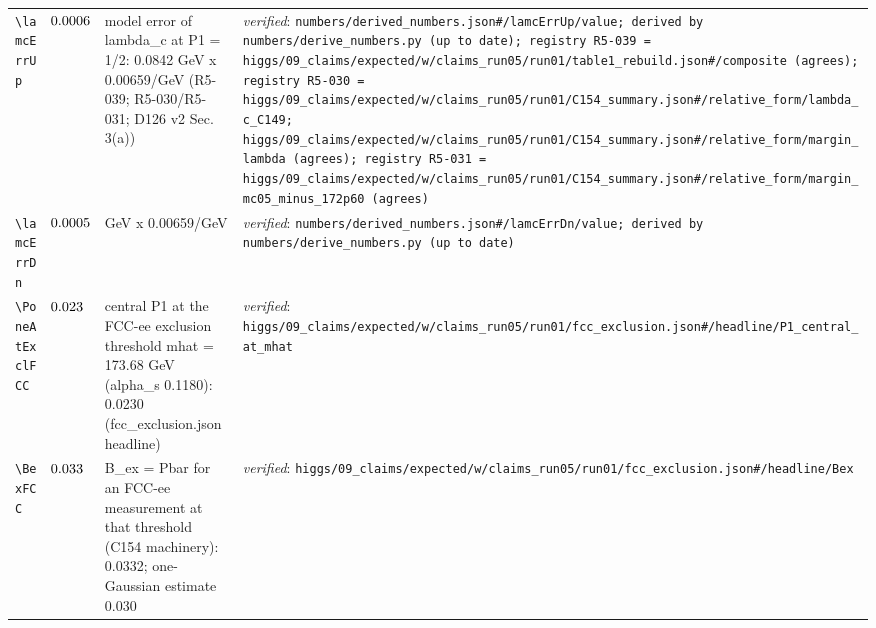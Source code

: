 {\begin{longtable}{@{}>{\raggedright\arraybackslash}p{}>{\raggedright\arraybackslash}p{}>{\raggedright\arraybackslash}p{}>{\raggedright\arraybackslash}p{}@{}}
\texttt{\textbackslash lamcErrUp} & $0.0006$ & model error of lambda\_\allowbreak{}c at P1 = 1/\allowbreak{}2: 0.0842 GeV x 0.00659/\allowbreak{}GeV (R5-039; R5-030/\allowbreak{}R5-031; D126 v2 Sec. 3(a)) & \emph{verified}: \texttt{numbers/\allowbreak{}derived\_\allowbreak{}numbers.json\#/\allowbreak{}lamcErrUp/\allowbreak{}value; derived by numbers/\allowbreak{}derive\_\allowbreak{}numbers.py (up to date); registry R5-039 = higgs/\allowbreak{}09\_\allowbreak{}claims/\allowbreak{}expected/\allowbreak{}w/\allowbreak{}claims\_\allowbreak{}run05/\allowbreak{}run01/\allowbreak{}table1\_\allowbreak{}rebuild.json\#/\allowbreak{}composite (agrees); registry R5-030 = higgs/\allowbreak{}09\_\allowbreak{}claims/\allowbreak{}expected/\allowbreak{}w/\allowbreak{}claims\_\allowbreak{}run05/\allowbreak{}run01/\allowbreak{}C154\_\allowbreak{}summary.json\#/\allowbreak{}relative\_\allowbreak{}form/\allowbreak{}lambda\_\allowbreak{}c\_\allowbreak{}C149; higgs/\allowbreak{}09\_\allowbreak{}claims/\allowbreak{}expected/\allowbreak{}w/\allowbreak{}claims\_\allowbreak{}run05/\allowbreak{}run01/\allowbreak{}C154\_\allowbreak{}summary.json\#/\allowbreak{}relative\_\allowbreak{}form/\allowbreak{}margin\_\allowbreak{}lambda (agrees); registry R5-031 = higgs/\allowbreak{}09\_\allowbreak{}claims/\allowbreak{}expected/\allowbreak{}w/\allowbreak{}claims\_\allowbreak{}run05/\allowbreak{}run01/\allowbreak{}C154\_\allowbreak{}summary.json\#/\allowbreak{}relative\_\allowbreak{}form/\allowbreak{}margin\_\allowbreak{}mc05\_\allowbreak{}minus\_\allowbreak{}172p60 (agrees)} \\
\texttt{\textbackslash lamcErrDn} & $0.0005$ & 0.0721 GeV x 0.00659/\allowbreak{}GeV & \emph{verified}: \texttt{numbers/\allowbreak{}derived\_\allowbreak{}numbers.json\#/\allowbreak{}lamcErrDn/\allowbreak{}value; derived by numbers/\allowbreak{}derive\_\allowbreak{}numbers.py (up to date)} \\
\texttt{\textbackslash PoneAtExclFCC} & $0.023$ & central P1 at the FCC-ee exclusion threshold mhat = 173.68 GeV (alpha\_\allowbreak{}s 0.1180): 0.0230 (fcc\_\allowbreak{}exclusion.json headline) & \emph{verified}: \texttt{higgs/\allowbreak{}09\_\allowbreak{}claims/\allowbreak{}expected/\allowbreak{}w/\allowbreak{}claims\_\allowbreak{}run05/\allowbreak{}run01/\allowbreak{}fcc\_\allowbreak{}exclusion.json\#/\allowbreak{}headline/\allowbreak{}P1\_\allowbreak{}central\_\allowbreak{}at\_\allowbreak{}mhat} \\
\texttt{\textbackslash BexFCC} & $0.033$ & B\_\allowbreak{}ex = Pbar for an FCC-ee measurement at that threshold (C154 machinery): 0.0332; one-Gaussian estimate 0.030 & \emph{verified}: \texttt{higgs/\allowbreak{}09\_\allowbreak{}claims/\allowbreak{}expected/\allowbreak{}w/\allowbreak{}claims\_\allowbreak{}run05/\allowbreak{}run01/\allowbreak{}fcc\_\allowbreak{}exclusion.json\#/\allowbreak{}headline/\allowbreak{}Bex} \\
\end{longtable}}

